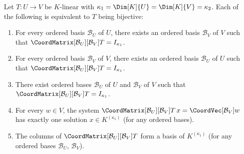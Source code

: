 \begin{theorem}
\label{thm:mat-bij}
    Let $T: U \to V$ be $K$-linear with $\kappa_1 = \Dim[K]{U} = \Dim[K]{V} = \kappa_2$.
    Each of the following is equivalent to $T$ being bijective:
    \begin{enumerate}
        \item For every ordered basis $\mathcal{B}_U$ of $U$, there exists an ordered basis
              $\mathcal{B}_V$ of $V$ such that $\CoordMatrix[\mathcal{B}_U][\mathcal{B}_V]{T} = I_{\kappa_1}$.
        \item For every ordered basis $\mathcal{B}_V$ of $V$, there exists an ordered basis
              $\mathcal{B}_U$ of $U$ such that $\CoordMatrix[\mathcal{B}_U][\mathcal{B}_V]{T} = I_{\kappa_1}$.
        \item There exist ordered bases $\mathcal{B}_U$ of $U$ and $\mathcal{B}_V$ of $V$
              such that $\CoordMatrix[\mathcal{B}_U][\mathcal{B}_V]{T} = I_{\kappa_1}$.
        \item For every $w \in V$, the system
              $\CoordMatrix[\mathcal{B}_U][\mathcal{B}_V]{T}\, x = \CoordVec[\mathcal{B}_V]{w}$
              has exactly one solution $x \in K^{(\kappa_1)}$ (for any ordered bases).
        \item The columns of $\CoordMatrix[\mathcal{B}_U][\mathcal{B}_V]{T}$ form a basis of
              $K^{(\kappa_1)}$ (for any ordered bases $\mathcal{B}_U$, $\mathcal{B}_V$).
    \end{enumerate}
\end{theorem}

